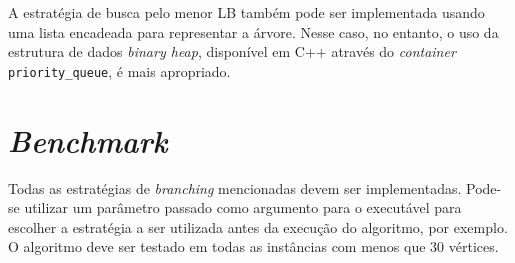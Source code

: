 {A estratégia de busca pelo menor LB também pode ser implementada usando uma lista encadeada para representar a árvore. Nesse caso, no entanto, o uso da estrutura de dados \textit{binary heap}, disponível em C++ através do \textit{container} \texttt{priority\_queue}, é mais apropriado. 

\section{\textit{Benchmark}}

Todas as estratégias de \textit{branching} mencionadas devem ser implementadas. Pode-se utilizar um parâmetro passado como argumento para o executável para escolher a estratégia a ser utilizada antes da execução do algoritmo, por exemplo. O algoritmo deve ser testado em todas as instâncias com menos que 30 vértices.

}

